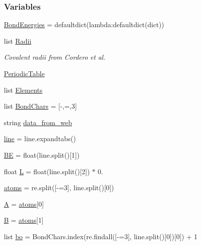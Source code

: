 \subsubsection*{Variables}
\begin{DoxyCompactItemize}
\item 
\hyperlink{namespacesrc_1_1chemistry_ab22cb6334c4383f04c147bcf4adf5374}{Bond\+Energies} = defaultdict(lambda\+:defaultdict(dict))
\item 
list \hyperlink{namespacesrc_1_1chemistry_af96fd92a64526125e88e64389117ff77}{Radii}
\begin{DoxyCompactList}\small\item\em Covalent radii from Cordero et al. \end{DoxyCompactList}\item 
\hyperlink{namespacesrc_1_1chemistry_a6e4691b3d86c5d03b20ddc39dff30bdb}{Periodic\+Table}
\item 
list \hyperlink{namespacesrc_1_1chemistry_ae63d9e3b53970a3c7ba82b78970cb7e2}{Elements}
\item 
list \hyperlink{namespacesrc_1_1chemistry_a582e8bcda9bcb269b87a1bda0ea996e1}{Bond\+Chars} = \mbox{[}\textquotesingle{}-\/\textquotesingle{},\textquotesingle{}=\textquotesingle{},\textquotesingle{}3\textquotesingle{}\mbox{]}
\item 
string \hyperlink{namespacesrc_1_1chemistry_a3605dbce6b93cc3407bb1030320f5cd0}{data\+\_\+from\+\_\+web}
\item 
\hyperlink{namespacesrc_1_1chemistry_a03302cdcc2126738b5aa1dfdc0c8777d}{line} = line.\+expandtabs()
\item 
\hyperlink{namespacesrc_1_1chemistry_a4ceca7d8e543e8866c0ad95b5a967551}{BE} = float(line.\+split()\mbox{[}1\mbox{]})
\item 
float \hyperlink{namespacesrc_1_1chemistry_ab523d2adfa843021628d784c390fb46f}{L} = float(line.\+split()\mbox{[}2\mbox{]}) $\ast$ 0.
\item 
\hyperlink{namespacesrc_1_1chemistry_a92d33a1aa706dcfde71fed97568964de}{atoms} = re.\+split(\textquotesingle{}\mbox{[}-\/=3\mbox{]}\textquotesingle{}, line.\+split()\mbox{[}0\mbox{]})
\item 
\hyperlink{namespacesrc_1_1chemistry_aa6456b6409fde4637bee2fb18999d881}{A} = \hyperlink{namespacesrc_1_1chemistry_a92d33a1aa706dcfde71fed97568964de}{atoms}\mbox{[}0\mbox{]}
\item 
\hyperlink{namespacesrc_1_1chemistry_a43668732826c79b3179214cf463b5d70}{B} = \hyperlink{namespacesrc_1_1chemistry_a92d33a1aa706dcfde71fed97568964de}{atoms}\mbox{[}1\mbox{]}
\item 
list \hyperlink{namespacesrc_1_1chemistry_abeb041126ad140ac88a8260a60a9398f}{bo} = Bond\+Chars.\+index(re.\+findall(\textquotesingle{}\mbox{[}-\/=3\mbox{]}\textquotesingle{}, line.\+split()\mbox{[}0\mbox{]})\mbox{[}0\mbox{]}) + 1
\end{DoxyCompactItemize}


